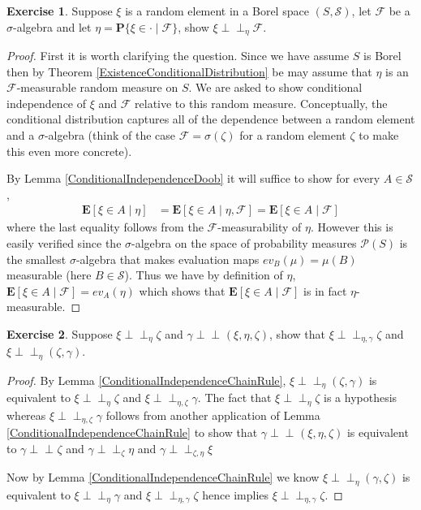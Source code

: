 \documentclass{amsbook}
\theoremstyle{definition}
\newtheorem{xca}{Exercise}
\theoremstyle{remark}
\newcommand{\Independent}{\perp \! \! \! \perp}
\newcommand{\cindependent}[3]{#1 \Independent_{#3} #2}
\newcommand{\cexpectationlong}[2]{\textbf{E}\left[ #2 \mid #1 \right]}
\newcommand{\cprobability}[2]{\textbf{P}\{#2 \mid #1\}}
\begin{document}
\begin{xca}Suppose $\xi$ is a random element in a Borel space $(S, \mathcal{S})$, let
  $\mathcal{F}$ be a $\sigma$-algebra and let $\eta =
  \cprobability{\mathcal{F}}{\xi \in \cdot}$, show $\cindependent{\xi}{\mathcal{F}}{\eta}$.
\end{xca}
\begin{proof}
First it is worth clarifying the question.  Since we have assume $S$
is Borel then by Theorem \ref{ExistenceConditionalDistribution} be may
assume that $\eta$ is an $\mathcal{F}$-measurable random measure on
$S$.  We are asked to show conditional independence of $\xi$ and
$\mathcal{F}$ relative to this random measure.  Conceptually, the
conditional distribution captures all of the dependence between a
random element and a $\sigma$-algebra (think of the case $\mathcal{F}
= \sigma(\zeta)$ for a random element $\zeta$ to make this even more concrete).  

By Lemma \ref{ConditionalIndependenceDoob} it will suffice to show for
every $A \in \mathcal{S}$, 
\begin{align*}
\cexpectationlong{\eta}{\xi \in  A} 
&= \cexpectationlong{\eta,\mathcal{F}}{\xi \in  A} 
= \cexpectationlong{\mathcal{F}}{\xi \in  A} 
\end{align*}
where the last equality follows from the $\mathcal{F}$-measurability
of $\eta$.  However this is easily verified since the $\sigma$-algebra
on the space of probability measures $\mathcal{P}(S)$ is the smallest $\sigma$-algebra that makes
evaluation maps $ev_B(\mu) = \mu(B)$ measurable (here $B \in \mathcal{S}$).  Thus we have by
definition of $\eta$, $\cexpectationlong{\mathcal{F}}{\xi \in  A} =
ev_A(\eta)$ which shows that $\cexpectationlong{\mathcal{F}}{\xi \in
  A}$ is in fact $\eta$-measurable.
\end{proof}

\begin{xca}Suppose $\cindependent{\xi}{\zeta}{\eta}$ and
  $\cindependent{\gamma}{(\xi,\eta, \zeta)}{}$, show that
  $\cindependent{\xi}{\zeta}{\eta,\gamma}$ and $\cindependent{\xi}{(\zeta,\gamma)}{\eta}$.
\end{xca}
\begin{proof}
By Lemma \ref{ConditionalIndependenceChainRule},
$\cindependent{\xi}{(\zeta,\gamma)}{\eta}$ is equivalent to
$\cindependent{\xi}{\zeta}{\eta}$ and
$\cindependent{\xi}{\gamma}{\eta, \zeta}$.  The fact that
$\cindependent{\xi}{\zeta}{\eta}$ is a hypothesis whereas
$\cindependent{\xi}{\gamma}{\eta, \zeta}$ follows from another
application of Lemma \ref{ConditionalIndependenceChainRule} to show
that $\cindependent{\gamma}{(\xi,\eta, \zeta)}{}$ is equivalent to
$\cindependent{\gamma}{\zeta}{}$ and
$\cindependent{\gamma}{\eta}{\zeta}$ and
$\cindependent{\gamma}{\xi}{\zeta, \eta}$

Now by Lemma \ref{ConditionalIndependenceChainRule} 
we know $\cindependent{\xi}{(\gamma, \zeta)}{\eta}$ is equivalent to
$\cindependent{\xi}{\gamma}{\eta}$ and
$\cindependent{\xi}{\zeta}{\eta, \gamma}$
hence implies $\cindependent{\xi}{\zeta}{\eta, \gamma}$.
\end{proof}
\end{document}
